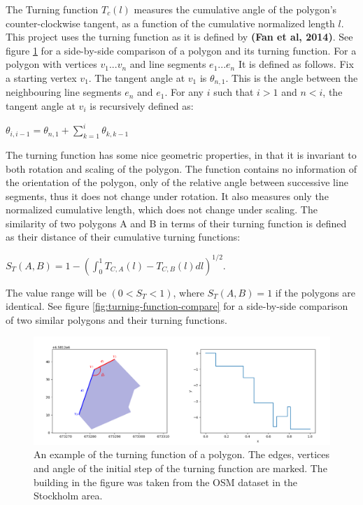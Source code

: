 \documentclass{kththesis}
\begin{document}
The Turning function $T_c(l)$ measures the cumulative angle of the polygon's counter-clockwise tangent, as a function of the cumulative normalized length $l$.
This project uses the turning function as it is defined by \textbf{(Fan et al, 2014)}.
See figure \ref{fig:turning-function} for a side-by-side comparison of a polygon and its turning function.
For a polygon with vertices ${v_1 ... v_n}$ and line segments ${e_1 ... e_n}$ It is defined as follows.
Fix a starting vertex $v_1$.
The tangent angle at $v_1$ is $\theta_{n,1}$. This is the angle between the neighbouring line segments $e_n$ and $e_1$.
For any $i$ such that $i>1$ and $n<i$, the tangent angle at $v_i$ is recursively defined as:
\begin{center}
    $\theta_{i, i-1} = \theta_{n,1} + \sum^{i}_{k=1} \theta_{k, k-1}$
\end{center}
The turning function has some nice geometric properties, in that it is invariant to both rotation and scaling of the polygon. The function contains no information of the orientation of the polygon, only of the relative angle between successive line segments, thus it does not change under rotation. It also measures only the normalized cumulative length, which does not change under scaling.
The similarity of two polygons A and B in terms of their turning function is defined as their distance of their cumulative turning functions:
\begin{center}
    $S_{T}(A, B) = 1 - (\int^{1}_{0} T_{C,A}(l) - T_{C,B}(l) dl)^{1/2}$.
\end{center}
The value range will be $(0 < S_{T} < 1)$, where $S_{T}(A,B) = 1$ if the polygons are identical. 
See figure \ref{fig:turning-function-compare} for a side-by-side comparison of two similar polygons and their turning functions.

\begin{figure}[H]
    \centering
    \includegraphics[width=\textwidth,height=0.5\textheight,keepaspectratio]{img_turn_function}
    \caption{An example of the turning function of a polygon. The edges, vertices and angle of the initial step of the turning function are marked. The building in the figure was taken from the OSM dataset in the Stockholm area.}
    \label{fig:turning-function}
\end{figure}
\end{document}
